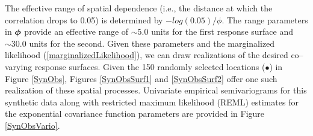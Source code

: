 \documentclass[a4paper]{article}
\newcommand{\bphi}{ \mbox{\boldmath $\phi$}}
\begin{document}
The effective range of spatial dependence (i.e., the distance at
which the correlation drops to 0.05) is determined by
$-log(0.05)/\phi$. The range parameters in $\bphi$ provide an
effective range of $\sim 5.0$ units for the first response surface
and $\sim 30.0$ units for the second.  Given these parameters and
the marginalized likelihood (\ref{marginalizedLikelihood}), we can
draw realizations of the desired co--varying response surfaces.
Given the 150 randomly selected locations ($\bullet$) in Figure \ref{SynObs}, Figures
\ref{SynObsSurf1} and \ref{SynObsSurf2} offer one such realization of these spatial
processes.  Univariate empirical semivariograms for this synthetic
data along with restricted maximum likelihood (REML) estimates for
the exponential covariance function parameters are provided in
Figure \ref{SynObsVario}.
\end{document}
